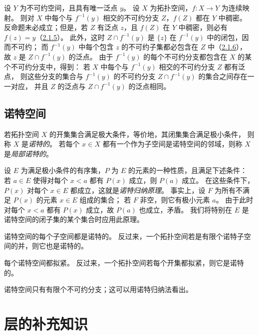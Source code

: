 设 $Y$ 为不可约空间，且具有唯一泛点 $y$。
设 $X$ 为拓扑空间，$f\colon X\to Y$ 为连续映射。
则对 $X$ 中每个与 $f^{-1}(y)$ 相交的不可约分支 $Z$，$f(Z)$ 都在 $Y$ 中稠密。
反命题未必成立；但是，若 $Z$ 有泛点 $z$，且 $f(Z)$ 在 $Y$ 中稠密，则必有 $f(z)=y$（\hyperlink{para:0:2.1.5}{2.1.5}）。
此外，这时 $Z\cap f^{-1}(y)$ 是 $\{z\}$ 在 $f^{-1}(y)$ 中的闭包，因而不可约；
而 $f^{-1}(y)$ 中每个包含 $z$ 的不可约子集都必包含在 $Z$ 中（\hyperlink{para:0:2.1.6}{2.1.6}），
故 $z$ 是 $Z\cap f^{-1}(y)$ 的泛点。
由于 $f^{-1}(y)$ 的每个不可约分支都包含在 $X$ 的某个不可约分支中，得到：
若 $X$ 中每个与 $f^{-1}(y)$ 相交的不可约分支 $Z$ 都有泛点，
则这些分支的集合与 $f^{-1}(y)$ 的不可约分支 $Z\cap f^{-1}(y)$ 的集合之间存在一一对应，
并且 $Z$ 的泛点与 $Z\cap f^{-1}(y)$ 的泛点相同。

\clearpage
\subsection{诺特空间}\hypertarget{heading:0:2.2}{}

若拓扑空间 $X$ 的开集集合满足极大条件，等价地，其闭集集合满足极小条件，
则称 $X$ 是\emph{诺特的}。
若每个 $x\in X$ 都有一个作为子空间是诺特空间的邻域，则称 $X$ 是\emph{局部诺特的}。

设 $E$ 为满足极小条件的有序集，$P$ 为 $E$ 的元素的一种性质，且满足下述条件：
若 $a\in E$ 使得对每个 $x<a$ 都有 $P(x)$ 成立，则 $P(a)$ 成立。
在这些条件下，$P(x)$ 对每个 $x\in E$ 都成立，这就是\emph{诺特归纳原理}。
事实上，设 $F$ 为所有不满足 $P(x)$ 的元素 $x\in E$ 组成的集合；
若 $F$ 非空，则它有极小元素 $a$。
由于此时对每个 $x<a$ 都有 $P(x)$ 成立，故 $P(a)$ 也成立，矛盾。
我们将特别在 $E$ 是诺特空间的闭子集的某个集合时应用此原理。

诺特空间的每个子空间都是诺特的。
反过来，一个拓扑空间若是有限个诺特子空间的并，则它也是诺特的。

每个诺特空间都拟紧。
反过来，一个拓扑空间若每个开集都拟紧，则它是诺特的。

诺特空间只有有限个不可约分支；这可以用诺特归纳法看出。



\par

\section{层的补充知识}\hypertarget{heading:0:3}{}
